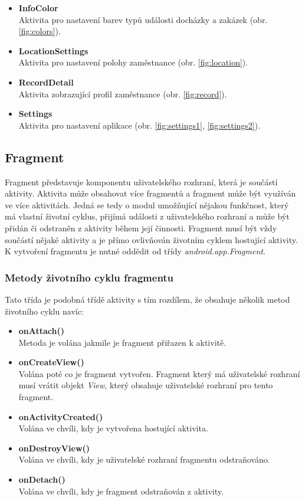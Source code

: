\documentclass{diplomka}
\begin{document}
\begin{itemize}[noitemsep,nolistsep]
\item \textbf{InfoColor}\\
Aktivita pro nastavení barev typů události docházky a zakázek (obr. \ref{fig:colors}).
\item \textbf{LocationSettings}\\
Aktivita pro nastavení polohy zaměstnance (obr. \ref{fig:location}).
\item \textbf{RecordDetail}\\
Aktivita zobrazující profil zaměstnance (obr. \ref{fig:record}).
\item \textbf{Settings}\\
Aktivita pro nastavení aplikace (obr. \ref{fig:settings1}, \ref{fig:settings2}).
\end{itemize}

\subsection{Fragment}
Fragment představuje komponentu uživatelského rozhraní, která je součástí aktivity. Aktivita může obsahovat více fragmentů a fragment může být využíván ve více aktivitách. Jedná se tedy o modul umožňující nějakou funkčnost, který má vlastní životní cyklus, přijímá události z uživatelského rozhraní a může být přidán či odstraněn z aktivity během její činnosti. Fragment musí být vždy součástí nějaké aktivity a je přímo ovlivňován životním cyklem hostující aktivity.
K vytvoření fragmentu je nutné oddědit od třídy \emph{android.app.Fragment}. 

\subsubsection*{Metody životního cyklu fragmentu}
Tato třída je podobná třídě aktivity s tím rozdílem, že obsahuje několik metod životního cyklu navíc:
\begin{itemize}[]
\item \textbf{onAttach()}\\
Metoda je volána jakmile je fragment přiřazen k aktivitě. 
\item \textbf{onCreateView()}\\
Volána poté co je fragment vytvořen. Fragment který má uživatelské rozhraní musí vrátit objekt \emph{View}, který obsahuje uživatelské rozhraní pro tento fragment.
\item \textbf{onActivityCreated()}\\
Volána ve chvíli, kdy je vytvořena hostující aktivita.
\item \textbf{onDestroyView()}\\
Volána ve chvíli, kdy je uživatelské rozhraní fragmentu odstraňováno.
\item \textbf{onDetach()}\\
Volána ve chvíli, kdy je fragment odstraňován z aktivity.
\end{itemize}
\end{document}
